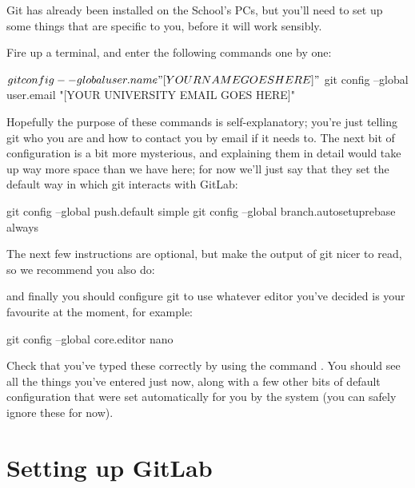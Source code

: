Git has already been installed on the School's PCs, but you'll need to set up some things that are specific to you, before it will work sensibly. 

Fire up a terminal, and enter the following commands one by one:

\begin{ttoutenv}
$ git config --global user.name "[YOUR NAME GOES HERE]"
$ git config --global user.email "[YOUR UNIVERSITY EMAIL GOES HERE]" 
\end{ttoutenv}

Hopefully the purpose of these commands is self-explanatory; you're just telling git who you are and how to contact you by email if it needs to. The next bit of configuration is a bit more mysterious, and explaining them in detail would take up way more space than we have here; for now we'll just say that they set the default way in which git interacts with GitLab:

\begin{ttoutenv}
git config --global push.default simple
git config --global branch.autosetuprebase always 
\end{ttoutenv}

The next few instructions are optional, but make the output of git nicer to read, so we recommend you also do:


and finally you should configure git to use whatever editor you've decided is your favourite at the moment, for example:

\begin{ttoutenv}
git config --global core.editor nano 
\end{ttoutenv}

Check that you've typed these correctly by using the command . You should see all the things you've entered just now, along with a few other bits of default configuration that were set automatically for you by the system (you can safely ignore these for now).

\section{Setting up GitLab}

